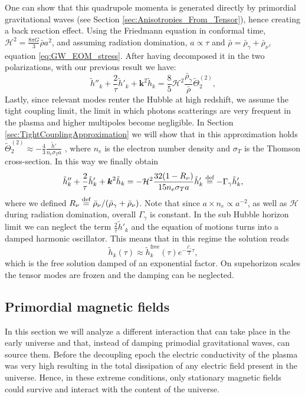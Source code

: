 One can show that this quadrupole momenta is generated directly by primordial gravitational waves (see Section \ref{sec:Anisotropies_From_Tensor}), hence creating a back reaction effect. Using the Friedmann equation in conformal time, $\mathcal{H}^2=\tfrac{8\pi G}{3}\bar\rho a^2$, and assuming radiation domination, $a\propto \tau$ and $\bar\rho=\bar\rho_\gamma+\bar\rho_\nu$, equation \eqref{eq:GW_EOM_stress}. After having decomposed it in the two polarizations, with our previous result we have:
$$
    \tilde h''_{k}+\frac{2}{\tau}\tilde h'_{k}+\boldsymbol{k}^2 \tilde h_{k}=\frac{8}{5}\mathcal{H}^2\frac{\bar\rho_\gamma}{\bar\rho}\tilde\Theta_2^{(2)},
$$
Lastly, since relevant modes renter the Hubble at high redshift, we assume the tight coupling limit, the limit in which photons scatterings are very frequent in the plasma and higher multipoles become negligible. In Section \ref{sec:TightCouplingApproximation} we will show that in this approximation holds $\tilde\Theta^{(2)}_2\approx-\tfrac43\tfrac{\tilde h'}{n_e\sigma_T a}$ ,
where $n_e$ is the electron number density and $\sigma_T$ is the Thomson cross-section. In this way we finally obtain 
$$
    \tilde h''_{k}+\frac{2}{\tau}\tilde h'_{k}+\boldsymbol{k}^2 \tilde h_{k}=-\mathcal{H}^2\frac{32(1-R_\nu)}{15n_e\sigma_T a}\tilde h'_{k}\stackrel{\text{def}}{=} -\Gamma_\gamma \tilde h'_k,
$$
where we defined $R_\nu\stackrel{\text{def}}{=}\bar\rho_\nu/(\bar\rho_\gamma+\bar\rho_\nu)$. Note that since $a\times n_e\propto a^{-2}$, as well as $\mathcal{H}$ during radiation domination, overall $\Gamma_\gamma$ is constant. In the sub Hubble horizon limit we can neglect the term $\tfrac2\tau \tilde h'_k$ and the equation of motions turns into a damped harmonic oscillator. This means that in this regime the solution reads 
\begin{equation}
    \tilde h_k(\tau)\approx\tilde h_k^{\text{free}}(\tau)e^{-\frac{\Gamma_\gamma}{2}\tau},
\end{equation} 
which is the free solution damped of an exponential factor. On supehorizon scales the tensor modes are frozen and the damping can be neglected.
\subsection{Primordial magnetic fields}
In this section we will analyze a different interaction that can take place in the early universe and that, instead of damping primodial gravitational waves, can source them. Before the decoupling epoch the electric conductivity of the plasma was very high resulting in the total dissipation of any electric field present in the universe. Hence, in these extreme conditions, only stationary magnetic fields could survive and interact with the content of the universe. 

